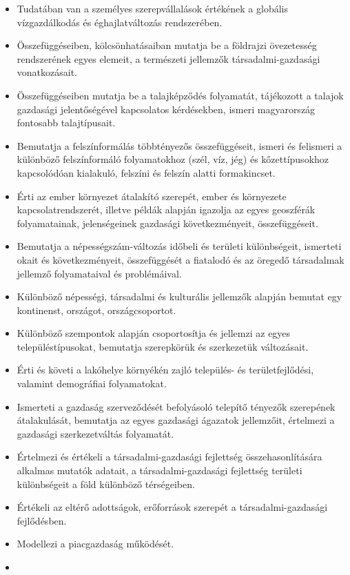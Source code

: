 \begin{itemize}
\item
  Tudatában van a személyes szerepvállalások értékének a globális
  vízgazdálkodás és éghajlatváltozás rendszerében.
\item
  Összefüggéseiben, kölcsönhatásaiban mutatja be a földrajzi övezetesség
  rendszerének egyes elemeit, a természeti jellemzők
  társadalmi-gazdasági vonatkozásait.
\item
  Összefüggéseiben mutatja be a talajképződés folyamatát, tájékozott a
  talajok gazdasági jelentőségével kapcsolatos kérdésekben, ismeri
  magyarország fontosabb talajtípusait.
\item
  Bemutatja a felszínformálás többtényezős összefüggéseit, ismeri és
  felismeri a különböző felszínformáló folyamatokhoz (szél, víz, jég) és
  kőzettípusokhoz kapcsolódóan kialakuló, felszíni és felszín alatti
  formakincset.
\item
  Érti az ember környezet átalakító szerepét, ember és környezete
  kapcsolatrendszerét, illetve példák alapján igazolja az egyes
  geoszférák folyamatainak, jelenségeinek gazdasági következményeit,
  összefüggéseit.
\item
  Bemutatja a népességszám-változás időbeli és területi különbségeit,
  ismerteti okait és következményeit, összefüggését a fiatalodó és az
  öregedő társadalmak jellemző folyamataival és problémáival.
\item
  Különböző népességi, társadalmi és kulturális jellemzők alapján
  bemutat egy kontinenst, országot, országcsoportot.
\item
  Különböző szempontok alapján csoportosítja és jellemzi az egyes
  településtípusokat, bemutatja szerepkörük és szerkezetük változásait.
\item
  Érti és követi a lakóhelye környékén zajló település- és
  területfejlődési, valamint demográfiai folyamatokat.
\item
  Ismerteti a gazdaság szerveződését befolyásoló telepítő tényezők
  szerepének átalakulását, bemutatja az egyes gazdasági ágazatok
  jellemzőit, értelmezi a gazdasági szerkezetváltás folyamatát.
\item
  Értelmezi és értékeli a társadalmi-gazdasági fejlettség
  összehasonlítására alkalmas mutatók adatait, a társadalmi-gazdasági
  fejlettség területi különbségeit a föld különböző térségeiben.
\item
  Értékeli az eltérő adottságok, erőforrások szerepét a
  társadalmi-gazdasági fejlődésben.
\item
  Modellezi a piacgazdaság működését.
\item

\end{itemize}
